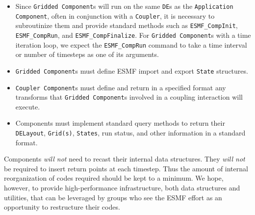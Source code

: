\begin{itemize}
\item Since {\tt Gridded Component}s will run on the same 
{\tt DE}s as the {\tt Application Component}, often in conjunction 
with a {\tt Coupler}, 
it is necessary to subroutinize
them and provide standard methods such as {\tt ESMF\_CompInit}, 
{\tt ESMF\_CompRun}, and {\tt ESMF\_CompFinalize}.  For {\tt Gridded 
Component}s
with a time iteration loop, we expect the {\tt ESMF\_CompRun} command to 
take a time interval or number of timesteps as one of its arguments.
\item {\tt Gridded Component}s must define ESMF import and export {\tt State} 
structures.
\item {\tt Coupler Component}s must define and return in a specified 
format any transforms that {\tt Gridded Component}s involved 
in a coupling interaction will execute.
\item Components must implement standard query methods to return
their {\tt DELayout}, {\tt Grid(s)}, {\tt States}, run status, and other 
information in a standard format.
\end{itemize}

Components {\it will not} need to recast their internal data structures.
They {\it will not} be required to insert return points at each timestep.
Thus the amount of internal reorganization of codes required should be 
kept to a minimum.  We hope, however, to provide high-performance infrastructure,
both data structures and utilities, that can be leveraged by groups who see
the ESMF effort as an opportunity to restructure their codes.



